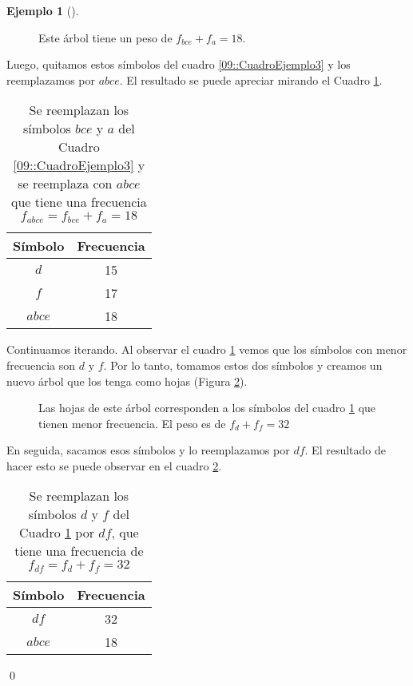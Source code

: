 \documentclass[english, spanish, fleqn, 10pt]{article}
\numberwithin{equation}{section}
\theoremstyle{definition}
\newtheorem{beforeExample}{Ejemplo}[section]
\newenvironment{ejemplo}[1][]{\begin{beforeExample}[#1]\renewcommand{\qedsymbol}{$\blacksquare$}}{\qed\end{beforeExample}}
\begin{document}
\begin{ejemplo}
\begin{figure}[!h]
	\caption{Este árbol tiene un peso de $f_{bce}+f_a=18$.}
	\label{09::EjemploArbol3}
\end{figure}
Luego, quitamos estos símbolos del cuadro \ref{09::CuadroEjemplo3} y los reemplazamos por $abce$. El resultado se puede apreciar mirando el Cuadro \ref{09::CuadroEjemplo4}.
\begin{table}[!h]
	\centering
	\begin{tabular}{c|c}
		Símbolo&Frecuencia\\
		\hline
		$d$&15\\
		$f$&17\\
		$abce$&18
	\end{tabular}
	\caption{Se reemplazan los símbolos $bce$ y $a$ del Cuadro \ref{09::CuadroEjemplo3} y se reemplaza con $abce$ que tiene una frecuencia $f_{abce}=f_{bce}+f_a=18$}
	\label{09::CuadroEjemplo4}
\end{table}

Continuamos iterando. Al observar el cuadro \ref{09::CuadroEjemplo4} vemos que los símbolos con menor frecuencia son $d$ y $f$. Por lo tanto, tomamos estos dos símbolos y creamos un nuevo árbol que los tenga como hojas (Figura \ref{09::EjemploArbol4}).
\begin{figure}[!h]
	\centering
	\caption{Las hojas de este árbol corresponden a los símbolos del cuadro \ref{09::CuadroEjemplo4} que tienen menor frecuencia. El peso es de $f_{d}+f_{f}=32$}
	\label{09::EjemploArbol4}
\end{figure}
En seguida, sacamos esos símbolos y lo reemplazamos por $df$. El resultado de hacer esto se puede observar en el cuadro \ref{09::CuadroEjemplo5}.
\begin{table}[!h]
	\centering
	\begin{tabular}{c|c}
		Símbolo&Frecuencia\\
		\hline
		$df$&32\\
		$abce$&18
	\end{tabular}
	\caption{Se reemplazan los símbolos $d$ y $f$ del Cuadro \ref{09::CuadroEjemplo4} por $df$, que tiene una frecuencia de $f_{df}=f_d+f_f=32$}
	\label{09::CuadroEjemplo5}
\end{table}


\end{ejemplo}
\end{document}
